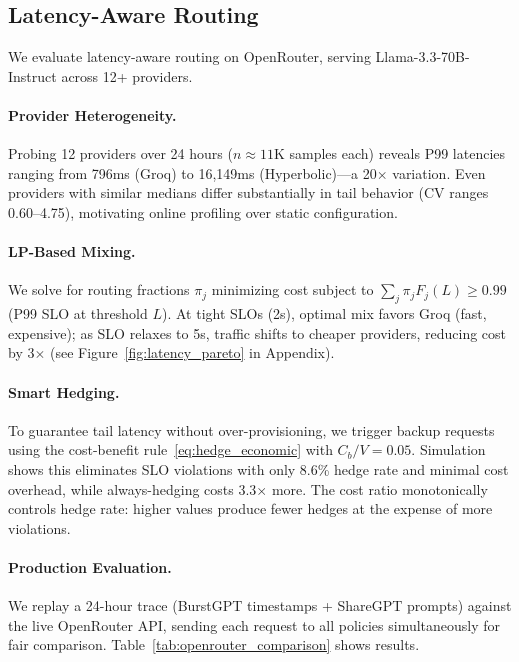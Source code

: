 \subsection{Latency-Aware Routing}

We evaluate latency-aware routing on OpenRouter, serving Llama-3.3-70B-Instruct across 12+ providers.

\paragraph{Provider Heterogeneity.}
Probing 12 providers over 24 hours ($n \approx 11$K samples each) reveals P99 latencies ranging from 796ms (Groq) to 16,149ms (Hyperbolic)---a 20$\times$ variation. Even providers with similar medians differ substantially in tail behavior (CV ranges 0.60--4.75), motivating online profiling over static configuration.

\paragraph{LP-Based Mixing.}
We solve for routing fractions $\pi_j$ minimizing cost subject to $\sum_j \pi_j F_j(L) \geq 0.99$ (P99 SLO at threshold $L$). At tight SLOs (2s), optimal mix favors Groq (fast, expensive); as SLO relaxes to 5s, traffic shifts to cheaper providers, reducing cost by 3$\times$ (see Figure~\ref{fig:latency_pareto} in Appendix).

\paragraph{Smart Hedging.}
To guarantee tail latency without over-provisioning, we trigger backup requests using the cost-benefit rule~\eqref{eq:hedge_economic} with $C_b/V = 0.05$. Simulation shows this eliminates SLO violations with only 8.6\% hedge rate and minimal cost overhead, while always-hedging costs 3.3$\times$ more. The cost ratio monotonically controls hedge rate: higher values produce fewer hedges at the expense of more violations.

\paragraph{Production Evaluation.}
We replay a 24-hour trace (BurstGPT timestamps + ShareGPT prompts) against the live OpenRouter API, sending each request to all policies simultaneously for fair comparison. Table~\ref{tab:openrouter_comparison} shows results.


